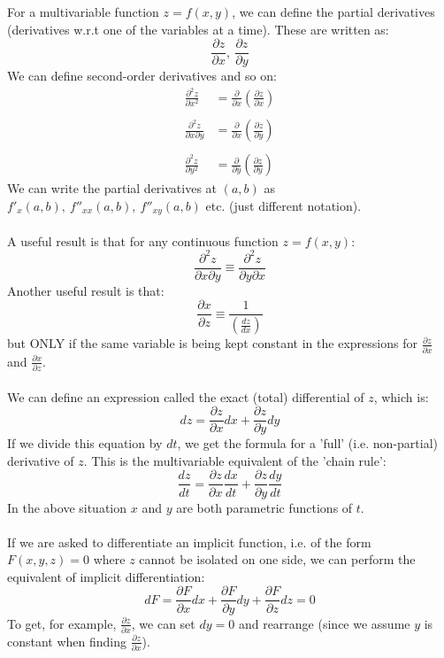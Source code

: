 \documentclass{scrartcl}
\begin{document}
For a multivariable function $ z = f(x, y) $, we can define the partial derivatives (derivatives w.r.t one of the variables at a time). These are written as:
\begin{equation}
\frac{\partial z}{\partial x}, \ \frac{\partial z}{\partial y}
\end{equation}
We can define second-order derivatives and so on:
\begin{align}
\frac{\partial^{2} z}{\partial x^{2}} & = \frac{\partial}{\partial x} (\frac{\partial z}{\partial x}) \\\\
\frac{\partial^{2} z}{\partial x \partial y} & = \frac{\partial}{\partial x} (\frac{\partial z}{\partial y}) \\\\
\frac{\partial^{2} z}{\partial y^{2}} & = \frac{\partial}{\partial y} (\frac{\partial z}{\partial y})
\end{align}
We can write the partial derivatives at $ (a, b) $ as $ f'_{x}(a, b), \ f''_{xx}(a, b), \ f''_{xy}(a, b) $ etc. (just different notation).
\\\\
A useful result is that for any continuous function $ z = f(x, y) $:
\begin{equation}
\frac{\partial^{2} z}{\partial x \partial y} \equiv \frac{\partial^{2} z}{\partial y \partial x}
\end{equation}
Another useful result is that:
\begin{equation}
\frac{\partial x}{\partial z} \equiv \frac{1}{(\frac{dz}{dx})}
\end{equation}
but ONLY if the same variable is being kept constant in the expressions for $ \frac{\partial z}{\partial x} $ and $ \frac{\partial x}{\partial z} $.
\\\\
We can define an expression called the exact (total) differential of $ z $, which is:
\begin{equation}
dz = \frac{\partial z}{\partial x}dx + \frac{\partial z}{\partial y}dy
\end{equation}
If we divide this equation by $ dt $, we get the formula for a 'full' (i.e. non-partial) derivative of $ z $. This is the multivariable equivalent of the 'chain rule':
\begin{equation}
\frac{dz}{dt} = \frac{\partial z}{\partial x}\frac{dx}{dt} + \frac{\partial z}{\partial y}\frac{dy}{dt}
\end{equation}
In the above situation $ x $ and $ y $ are both parametric functions of $ t $.
\\\\
If we are asked to differentiate an implicit function, i.e. of the form $ F(x, y, z) = 0 $ where $ z $ cannot be isolated on one side, we can perform the equivalent of implicit differentiation:
\begin{equation}
dF = \frac{\partial F}{\partial x}dx + \frac{\partial F}{\partial y}dy + \frac{\partial F}{\partial z}dz = 0
\end{equation}
To get, for example, $ \frac{\partial z}{\partial x} $, we can set $ dy = 0 $ and rearrange (since we assume $ y $ is constant when finding $ \frac{\partial z}{\partial x} $).
\end{document}

